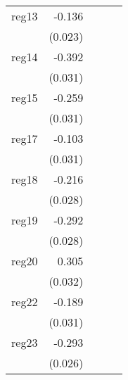 {\begin{longtable}{l*{4}{D{.}{.}{-1}}}
\addlinespace
reg13       &      -0.136\sym{***}&                     &                     &                     \\
            &     (0.023)         &                     &                     &                     \\
\addlinespace
reg14       &      -0.392\sym{***}&                     &                     &                     \\
            &     (0.031)         &                     &                     &                     \\
\addlinespace
reg15       &      -0.259\sym{***}&                     &                     &                     \\
            &     (0.031)         &                     &                     &                     \\
\addlinespace
reg17       &      -0.103\sym{**} &                     &                     &                     \\
            &     (0.031)         &                     &                     &                     \\
\addlinespace
reg18       &      -0.216\sym{***}&                     &                     &                     \\
            &     (0.028)         &                     &                     &                     \\
\addlinespace
reg19       &      -0.292\sym{***}&                     &                     &                     \\
            &     (0.028)         &                     &                     &                     \\
\addlinespace
reg20       &       0.305\sym{***}&                     &                     &                     \\
            &     (0.032)         &                     &                     &                     \\
\addlinespace
reg22       &      -0.189\sym{***}&                     &                     &                     \\
            &     (0.031)         &                     &                     &                     \\
\addlinespace
reg23       &      -0.293\sym{***}&                     &                     &                     \\
            &     (0.026)         &                     &                     &                     \\

\end{longtable}}
